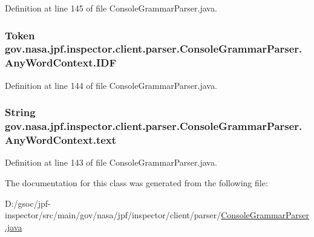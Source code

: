 Definition at line 145 of file Console\+Grammar\+Parser.\+java.

\subsubsection[{\texorpdfstring{I\+DF}{IDF}}]{\setlength{\rightskip}{0pt plus 5cm}Token gov.\+nasa.\+jpf.\+inspector.\+client.\+parser.\+Console\+Grammar\+Parser.\+Any\+Word\+Context.\+I\+DF}\hypertarget{classgov_1_1nasa_1_1jpf_1_1inspector_1_1client_1_1parser_1_1_console_grammar_parser_1_1_any_word_context_a72899a8a2e40e2496b6da21951af7d4d}{}\label{classgov_1_1nasa_1_1jpf_1_1inspector_1_1client_1_1parser_1_1_console_grammar_parser_1_1_any_word_context_a72899a8a2e40e2496b6da21951af7d4d}


Definition at line 144 of file Console\+Grammar\+Parser.\+java.

\subsubsection[{\texorpdfstring{text}{text}}]{\setlength{\rightskip}{0pt plus 5cm}String gov.\+nasa.\+jpf.\+inspector.\+client.\+parser.\+Console\+Grammar\+Parser.\+Any\+Word\+Context.\+text}\hypertarget{classgov_1_1nasa_1_1jpf_1_1inspector_1_1client_1_1parser_1_1_console_grammar_parser_1_1_any_word_context_a621f0389697046043b16283be4ac6c45}{}\label{classgov_1_1nasa_1_1jpf_1_1inspector_1_1client_1_1parser_1_1_console_grammar_parser_1_1_any_word_context_a621f0389697046043b16283be4ac6c45}


Definition at line 143 of file Console\+Grammar\+Parser.\+java.



The documentation for this class was generated from the following file\+:\begin{DoxyCompactItemize}
\item 
D\+:/gsoc/jpf-\/inspector/src/main/gov/nasa/jpf/inspector/client/parser/\hyperlink{_console_grammar_parser_8java}{Console\+Grammar\+Parser.\+java}\end{DoxyCompactItemize}
